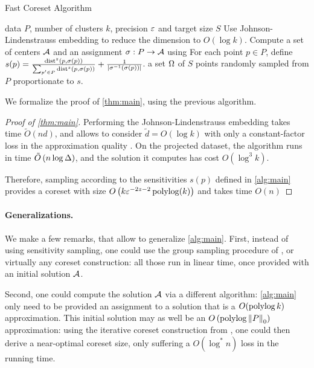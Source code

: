 \begin{algorithm}[tb]
   \caption{Fast Coreset Algorithm}
   \label{alg:main}
\begin{algorithmic}
    data $P$, number of clusters $k$, precision $\varepsilon$ and target size $S$
   \STATE Use Johnson-Lindenstrauss embedding to reduce the dimension to $O(\log k)$.
   \STATE Compute a set of centers $\mathcal A$ and an assignment $\sigma : P \rightarrow \mathcal A$ using \fkmeans
   \STATE For each point $p \in P$, define $s(p) = \frac{\operatorname{dist}^z(p, \sigma(p))}{\sum_{p' \in P} \operatorname{dist}^z(p, \sigma(p))} + \frac{1}{|\sigma^{-1}(\sigma(p))|}$.
    a set $\Omega$ of $S$ points randomly sampled from $P$ proportionate to $s$.
\end{algorithmic}
\end{algorithm}


We formalize the proof of \cref{thm:main}, using the previous algorithm.

\begin{proof}[Proof of \cref{thm:main}]
Performing the Johnson-Lindenstrauss embedding takes time $\tilde O(nd)$, and allows to consider $\tilde d=O(\log k)$ with only a constant-factor loss in the approximation quality  \cite{makarychev2019performance}. 
On the projected dataset, the algorithm \fkmeans runs in time $\tilde O\left( n \log \Delta\right)$, and the solution it computes has cost $O(\log^3 k)$. 

Therefore, sampling according to the sensitivities $s(p)$ defined in \cref{alg:main} provides a coreset with size $O \left( k \varepsilon^{-2z -2}\operatorname{polylog}(k) \right)$  and takes time $O(n)$ 
\end{proof}

\paragraph{Generalizations.} 
We make a few remarks, that allow to generalize \cref{alg:main}.
First, instead of using sensitivity sampling, one could use the group sampling procedure of \cite{stoc21}, or virtually any coreset construction: all those run in linear time, once provided with an initial solution $\mathcal A$. 

Second, one could compute the solution $\mathcal A$ via a different algorithm: \cref{alg:main} only need to be provided an assignment to a solution that is a $O(\operatorname{polylog} k)$ approximation. 
This initial solution may as well be an $O\left(\operatorname{polylog} \left\| P \right\|_0 \right)$ approximation: using the iterative coreset construction from \cite{BravermanJKW21}, one could then derive a near-optimal coreset size, only suffering a $O(\log^* n)$ loss in the running time.

